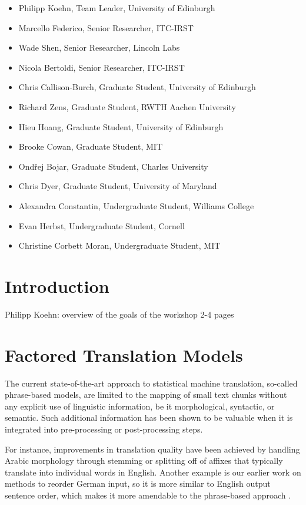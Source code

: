 \documentclass[10pt]{report}
\theoremstyle{plain}
\begin{document}
\begin{itemize}
\item Philipp Koehn, Team Leader, University of Edinburgh
\item Marcello Federico, Senior Researcher, ITC-IRST
\item Wade Shen, Senior Researcher, Lincoln Labs
\item Nicola Bertoldi, Senior Researcher, ITC-IRST
\item Chris Callison-Burch, Graduate Student, University of Edinburgh
\item Richard Zens, Graduate Student, RWTH Aachen University
\item Hieu Hoang, Graduate Student, University of Edinburgh
\item Brooke Cowan, Graduate Student, MIT
\item Ond\v{r}ej Bojar, Graduate Student, Charles University
\item Chris Dyer, Graduate Student, University of Maryland
\item Alexandra Constantin, Undergraduate Student, Williams College
\item Evan Herbst, Undergraduate Student, Cornell
\item Christine Corbett Moran, Undergraduate Student, MIT
\end{itemize}

\tableofcontents

\chapter{Introduction}
{\sc Philipp Koehn: overview of the goals of the workshop 2-4 pages}

\chapter{Factored Translation Models}
The current state-of-the-art approach to statistical machine translation, so-called phrase-based models, are limited to the mapping of small text chunks without any explicit use of linguistic information, be it morphological, syntactic, or semantic. Such additional information has been shown to be valuable when it is integrated into pre-processing or post-processing steps. 

For instance, improvements in translation quality have been achieved by handling Arabic morphology through stemming or splitting off of affixes that typically translate into individual words in English. Another example is our earlier work on methods to reorder German input, so it is more similar to English output sentence order, which makes it more amendable to the phrase-based approach \cite{Collins2005}.
\end{document}
